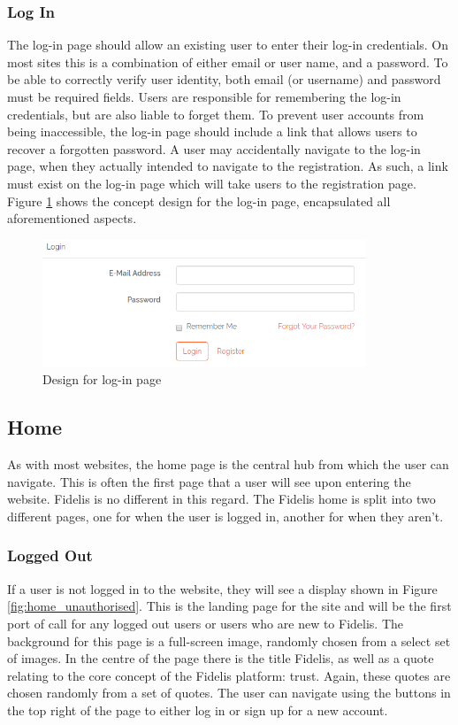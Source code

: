 \subsubsection{Log In}
The log-in page should allow an existing user to enter their log-in credentials. On most sites this is a combination of either email or user name, and a password. To be able to correctly verify user identity, both email (or username) and password must be required fields. Users are responsible for remembering the log-in credentials, but are also liable to forget them. To prevent user accounts from being inaccessible, the log-in page should include a link that allows users to recover a forgotten password. A user may accidentally navigate to the log-in page, when they actually intended to navigate to the registration. As such, a link must exist on the log-in page which will take users to the registration page. Figure \ref{fig:login-page} shows the concept design for the log-in page, encapsulated all aforementioned aspects.

\begin{figure}[H]
\centering
\includegraphics[height=1.5in]{Images/Design/login-page}
\caption{Design for log-in page}
\label{fig:login-page}
\end{figure}

\subsection{Home}
As with most websites, the home page is the central hub from which the user can navigate. This is often the first page that a user will see upon entering the website. Fidelis is no different in this regard. The Fidelis home is split into two different pages, one for when the user is logged in, another for when they aren't.

\subsubsection{Logged Out}
If a user is not logged in to the website, they will see a display shown in Figure \ref{fig:home_unauthorised}. This is the landing page for the site and will be the first port of call for any logged out users or users who are new to Fidelis. The background for this page is a full-screen image, randomly chosen from a select set of images. In the centre of the page there is the title Fidelis, as well as a quote relating to the core concept of the Fidelis platform: trust. Again, these quotes are chosen randomly from a set of quotes. The user can navigate using the buttons in the top right of the page to either log in or sign up for a new account.

